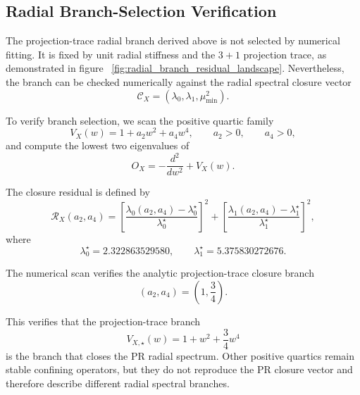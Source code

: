 \documentclass[11pt]{article}
\begin{document}
\subsection{Radial Branch-Selection Verification}
\label{sec:radial_branch_selection_verification}

The projection-trace radial branch derived above is not selected by numerical fitting. It is fixed by unit radial stiffness and the \(3+1\) projection trace, as demonstrated in figure ~\ref{fig:radial_branch_residual_landscape}. Nevertheless, the branch can be checked numerically against the radial spectral closure vector
\begin{equation}
\mathcal C_X
=
\left(
\lambda_0,
\lambda_1,
\mu_{\min}^2
\right).
\end{equation}

To verify branch selection, we scan the positive quartic family
\begin{equation}
V_X(w)
=
1+a_2w^2+a_4w^4,
\qquad
a_2>0,
\qquad
a_4>0,
\end{equation}
and compute the lowest two eigenvalues of
\begin{equation}
O_X
=
-\frac{d^2}{dw^2}
+
V_X(w).
\end{equation}

The closure residual is defined by
\begin{equation}
\mathcal R_X(a_2,a_4)
=
\left[
\frac{
\lambda_0(a_2,a_4)-\lambda_0^{\star}
}{
\lambda_0^{\star}
}
\right]^2
+
\left[
\frac{
\lambda_1(a_2,a_4)-\lambda_1^{\star}
}{
\lambda_1^{\star}
}
\right]^2,
\end{equation}
where
\begin{equation}
\lambda_0^{\star}
=
2.322863529580,
\qquad
\lambda_1^{\star}
=
5.375830272676.
\end{equation}

The numerical scan verifies the analytic projection-trace closure branch
\begin{equation}
\boxed{
(a_2,a_4)
=
\left(
1,\frac{3}{4}
\right).
}
\end{equation}

This verifies that the projection-trace branch
\begin{equation}
\boxed{
V_{X,\star}(w)
=
1+w^2+\frac{3}{4}w^4
}
\end{equation}
is the branch that closes the PR radial spectrum. Other positive quartics remain stable confining operators, but they do not reproduce the PR closure vector and therefore describe different radial spectral branches.
\end{document}

